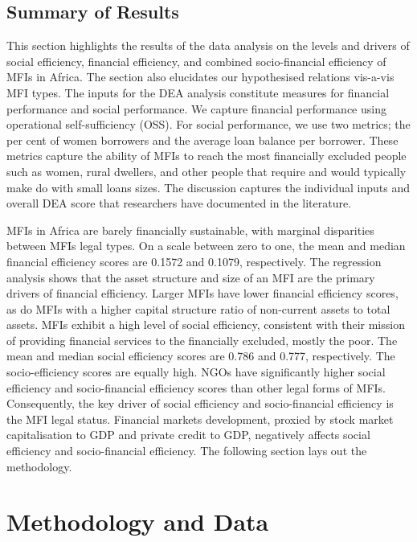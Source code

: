 \documentclass[a4paper, nobind]{templates/ociamthesis}
\begin{document}
\hypertarget{summary-of-results-2}{%
\subsection{Summary of Results}\label{summary-of-results-2}}

This section highlights the results of the data analysis on the levels and drivers of social efficiency, financial efficiency, and combined socio-financial efficiency of MFIs in Africa. The section also elucidates our hypothesised relations vis-a-vis MFI types. The inputs for the DEA analysis constitute measures for financial performance and social performance. We capture financial performance using operational self-sufficiency (OSS). For social performance, we use two metrics; the per cent of women borrowers and the average loan balance per borrower. These metrics capture the ability of MFIs to reach the most financially excluded people such as women, rural dwellers, and other people that require and would typically make do with small loans sizes. The discussion captures the individual inputs and overall DEA score that researchers have documented in the literature.

MFIs in Africa are barely financially sustainable, with marginal disparities between MFIs legal types. On a scale between zero to one, the mean and median financial efficiency scores are 0.1572 and 0.1079, respectively. The regression analysis shows that the asset structure and size of an MFI are the primary drivers of financial efficiency. Larger MFIs have lower financial efficiency scores, as do MFIs with a higher capital structure ratio of non-current assets to total assets. MFIs exhibit a high level of social efficiency, consistent with their mission of providing financial services to the financially excluded, mostly the poor. The mean and median social efficiency scores are 0.786 and 0.777, respectively. The socio-efficiency scores are equally high. NGOs have significantly higher social efficiency and socio-financial efficiency scores than other legal forms of MFIs. Consequently, the key driver of social efficiency and socio-financial efficiency is the MFI legal status. Financial markets development, proxied by stock market capitalisation to GDP and private credit to GDP, negatively affects social efficiency and socio-financial efficiency. The following section lays out the methodology.

\hypertarget{methodology-and-data}{%
\section{Methodology and Data}\label{methodology-and-data}}
\end{document}
